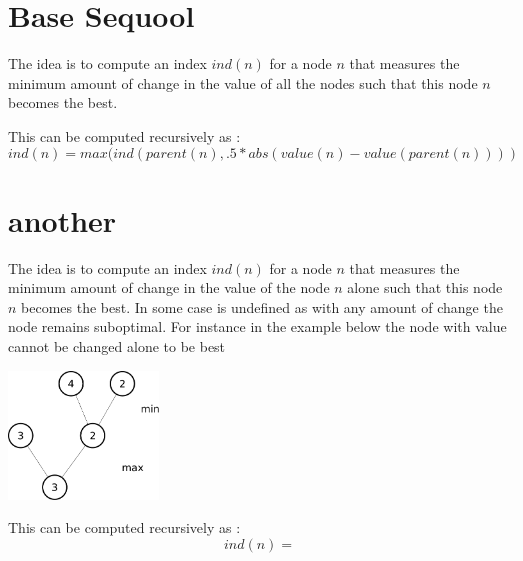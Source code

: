 \documentclass[]{article}
\title{}
\author{}
\begin{document}
\maketitle

\begin{abstract}

\end{abstract}

\section{Base Sequool}
The idea is to compute an index $ind(n)$ for a node $n$ that measures the minimum amount of change  in the value of all the nodes such that this node $n$ becomes the best.

This can be computed recursively as :
$$ind(n) = max( ind(parent(n),.5*abs(value(n)-value(parent(n)))) $$

\section{another}
The idea is to compute an index $ind(n)$ for a node $n$ that measures the minimum amount of change  in the value of  the node $n$ alone such that this node $n$ becomes the best.
In some case is undefined as with any amount of change the node remains suboptimal. For instance in the example below
the node with value cannot be changed alone to be best

\includegraphics[width=4cm]{treeanother}


This can be computed recursively as :
$$ind(n) =  $$
\end{document}
